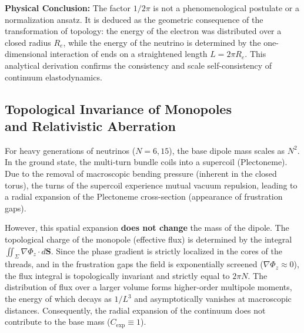 \documentclass[11pt,a4paper]{article}
\begin{document}
	\textbf{Physical Conclusion:} The factor $1/2\pi$ is not a phenomenological postulate or a normalization ansatz. It is deduced as the geometric consequence of the transformation of topology: the energy of the electron was distributed over a closed radius $R_e$, while the energy of the neutrino is determined by the one-dimensional interaction of ends on a straightened length $L = 2\pi R_e$. This analytical derivation confirms the consistency and scale self-consistency of continuum elastodynamics.
	
\subsection{Topological Invariance of Monopoles \\ and Relativistic Aberration}
	For heavy generations of neutrinos ($N=6, 15$), the base dipole mass scales as $N^2$. In the ground state, the multi-turn bundle coils into a supercoil (Plectoneme). Due to the removal of macroscopic bending pressure (inherent in the closed torus), the turns of the supercoil experience mutual vacuum repulsion, leading to a radial expansion of the Plectoneme cross-section (appearance of frustration gaps).
	
	However, this spatial expansion \textbf{does not change} the mass of the dipole. The topological charge of the monopole (effective flux) is determined by the integral $\iint_\Sigma \nabla \Phi_z \cdot d\mathbf{S}$. Since the phase gradient is strictly localized in the cores of the threads, and in the frustration gaps the field is exponentially screened ($\nabla \Phi_z \approx 0$), the flux integral is topologically invariant and strictly equal to $2\pi N$. The distribution of flux over a larger volume forms higher-order multipole moments, the energy of which decays as $1/L^3$ and asymptotically vanishes at macroscopic distances. Consequently, the radial expansion of the continuum does not contribute to the base mass ($C_{\text{exp}} \equiv 1$).
	
\end{document}
